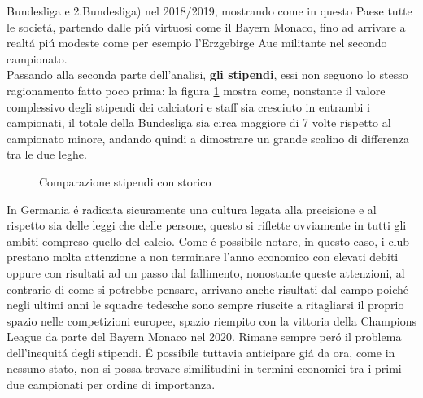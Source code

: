 \documentclass[
    corpo=12pt,
    oneside,
    evenboxes,
    tipotesi=triennale,
    stile=classica,
    oldstyle,
    autoretitolo,
    greek,
]{toptesi}
\begin{document}
\begin{interlinea}{1.5}
Bundesliga e 2.Bundesliga) nel 2018/2019, mostrando come in questo Paese tutte le societ\'a, partendo dalle pi\'u virtuosi 
come il Bayern Monaco, fino ad arrivare a realt\'a pi\'u modeste come per esempio l'Erzgebirge Aue militante nel secondo campionato.\\
Passando alla seconda parte dell'analisi, \textbf{gli stipendi}, essi non seguono lo stesso ragionamento fatto poco prima: la figura 
\ref{comparazione_stipendi_germania} mostra come, nonstante il valore complessivo degli stipendi dei calciatori e staff sia cresciuto in entrambi
i campionati, il totale della Bundesliga sia circa maggiore di 7 volte rispetto al campionato minore, andando quindi a dimostrare
un grande scalino di differenza tra le due leghe.
\begin{figure}
    \centering
     \quad
    \caption{Comparazione stipendi con storico}
    \label{comparazione_stipendi_germania}  
\end{figure}
In Germania \'e radicata sicuramente una cultura legata alla precisione e al rispetto sia delle leggi che delle persone, questo si riflette 
ovviamente in tutti gli ambiti compreso quello del calcio. Come \'e possibile notare, in questo caso, i club prestano molta attenzione a non 
terminare l'anno economico con elevati debiti oppure con risultati ad un passo dal fallimento, nonostante queste attenzioni, al contrario
di come si potrebbe pensare, arrivano anche risultati dal campo poich\'e negli ultimi anni le squadre tedesche sono sempre riuscite a ritagliarsi 
il proprio spazio nelle competizioni europee, spazio riempito con la vittoria della Champions League da parte del Bayern Monaco nel 2020. 
Rimane sempre per\'o il problema dell'inequit\'a degli stipendi. \'E possibile tuttavia anticipare gi\'a da ora, come in nessuno stato, non si possa
trovare similitudini in termini economici tra i primi due campionati per ordine di importanza.\newline

\end{interlinea}
\end{document}
